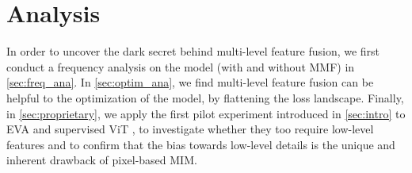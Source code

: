 \section{Analysis}
In order to uncover the dark secret behind multi-level feature fusion, we first conduct a frequency analysis on the model (with and without MMF) in \autoref{sec:freq_ana}. In \autoref{sec:optim_ana}, we find multi-level feature fusion can be helpful to the optimization of the model, by flattening the loss landscape. Finally, in \autoref{sec:proprietary}, we apply the first pilot experiment introduced in \autoref{sec:intro} to EVA \cite{EVA} and supervised ViT \cite{MAE}, to investigate whether they too require low-level features and to confirm that the bias towards low-level details is the unique and inherent drawback of pixel-based MIM.
\label{sec:analysis}


